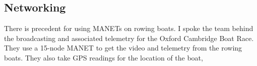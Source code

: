 \documentclass[12pt,a4paper]{report}
\begin{document}
\subsection{Networking}
There is precedent for using MANETs on rowing boats. I spoke the team behind the broadcasting and associated telemetry for the Oxford Cambridge Boat Race. They use a 15-node MANET to get the video and telemetry from the rowing boats. They also take GPS readings for the location of the boat,
\end{document}
